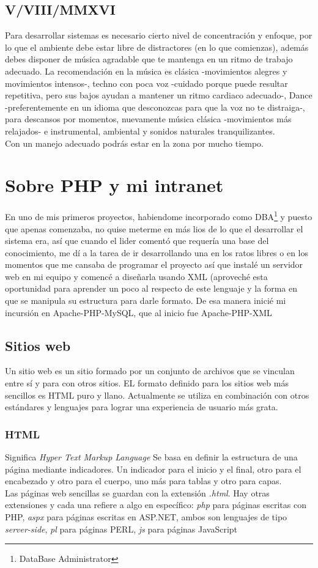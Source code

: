 \documentclass[12pt,spanish,lettersize]{book}
\begin{document}
\section{V/VIII/MMXVI}

Para desarrollar sistemas es necesario cierto nivel de concentraci\'on y enfoque, por lo que el ambiente debe estar libre de distractores (en lo que comienzas), adem\'as debes disponer de m\'usica agradable que te mantenga en un ritmo de trabajo adecuado. La recomendaci\'on en la m\'usica es cl\'asica -movimientos alegres y movimientos intensos-, techno con poca voz -cuidado porque puede resultar repetitiva, pero sus bajos ayudan a mantener un ritmo cardiaco adecuado-, Dance -preferentemente en un idioma que desconozcas para que la voz no te distraiga-, para descansos por momentos, nuevamente m\'usica cl\'asica -movimientos m\'as relajados- e instrumental, ambiental y sonidos naturales tranquilizantes. \\

Con un manejo adecuado podr\'as estar en la zona por mucho tiempo. 

\chapter{Sobre PHP y mi intranet}
En uno de mis primeros proyectos, habiendome incorporado como DBA\footnote{DataBase Administrator} y puesto que apenas comenzaba, no quise meterme en m\'as lios de lo que el desarrollar el sistema era, as\'i que cuando el lider coment\'o que requer\'ia una base del conocimiento, me d\'i a la tarea de ir desarrollando una en los ratos libres o en los momentos que me cansaba de programar el proyecto as\'i que instal\'e un servidor web en mi equipo y comenc\'e a dise\~narla usando XML (aprovech\'e esta oportunidad para aprender un poco al respecto de este lenguaje y la forma en que se manipula su estructura para darle formato. De esa manera inici\'e mi incursi\'on en Apache-PHP-MySQL, que al inicio fue Apache-PHP-XML
\section{Sitios web}
Un sitio web es un sitio formado por un conjunto de archivos que se vinculan entre s\'i y para con otros sitios. EL formato definido para los sitios web m\'as sencillos es HTML puro y llano. Actualmente se utiliza en combinaci\'on con otros estándares y lenguajes para lograr una experiencia de usuario m\'as grata.
\subsection{HTML}
Significa \emph{Hyper Text Markup Language} Se basa en definir la estructura de una p\'agina mediante indicadores. Un indicador para el inicio y el final, otro para el encabezado y otro para el cuerpo, uno m\'as para tablas y otro para capas.\\
Las p\'aginas web sencillas se guardan con la extensi\'on \emph{.html}. Hay otras extensiones y cada una refiere a algo en espec\'ifico: \emph{php} para p\'aginas escritas con PHP, \emph{aspx} para p\'aginas escritas en ASP.NET, ambos son lenguajes de tipo \emph{server-side}, \emph{pl} para p\'aginas PERL, \emph{js} para p\'aginas JavaScript
\end{document}
